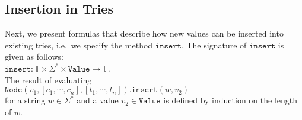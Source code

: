 \subsection{Insertion in Tries}
Next, we present formulas that describe how new values can be inserted into existing tries,
i.e.~we specify the method $\texttt{insert}$.  The signature of $\texttt{insert}$ is given as follows:
\\[0.2cm]
\hspace*{1.3cm}
$\texttt{insert}: \mathbb{T} \times \Sigma^* \times \texttt{Value} \rightarrow \mathbb{T}$.
\\[0.2cm]
The result of evaluating \\[0.2cm]
\hspace*{1.3cm} 
$\texttt{Node}(v_1, [c_1, \cdots, c_n], [t_1, \cdots, t_n]).\texttt{insert}(w, v_2)$
\\[0.2cm]
for a string $w\in \Sigma^*$ and a value $v_2 \in \texttt{Value}$ is defined by induction on the
length of $w$.

